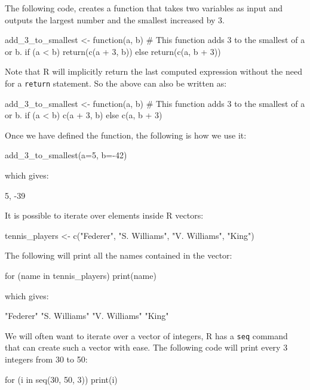 The following code, creates a function that takes two variables as input and
outputs the largest number and the smallest increased by 3.

\begin{Rin}
add_3_to_smallest <- function(a, b) {
  # This function adds 3 to the smallest of a or b.
  if (a < b) {
    return(c(a + 3, b))
  }
  else {
    return(c(a, b + 3))
  }
}
\end{Rin}

Note that R will implicitly return the last computed expression without the need
for a \texttt{return} statement. So the above can also be written as:

\begin{Rin}
add_3_to_smallest <- function(a, b) {
  # This function adds 3 to the smallest of a or b.
  if (a < b) {
    c(a + 3, b)
  }
  else {
    c(a, b + 3)
  }
}
\end{Rin}

Once we have defined the function, the following is how we use it:

\begin{Rin}
add_3_to_smallest(a=5, b=-42)
\end{Rin}

which gives:

\begin{Rout}
5, -39
\end{Rout}

It is possible to iterate over elements inside R vectors:

\begin{Rin}
tennis_players <- c("Federer", "S. Williams", "V. Williams", "King")
\end{Rin}

The following will print all the names contained in the vector:

\begin{Rin}
for (name in tennis_players) {
    print(name)
}
\end{Rin}

which gives:

\begin{Rout}
"Federer"
"S. Williams"
"V. Williams"
"King"
\end{Rout}

We will often want to iterate over a vector of integers, R has a \texttt
{seq}
command that can create such a vector with ease. The following
code will print every 3 integers from 30 to 50:

\begin{Rin}
for (i in seq(30, 50, 3)) {
  print(i)
}
\end{Rin}

